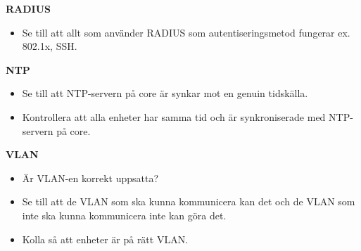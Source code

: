 \noindent \textbf{RADIUS}
\begin{itemize}[noitemsep]
    \item Se till att allt som använder RADIUS som autentiseringsmetod fungerar ex. 802.1x, SSH.
\end{itemize}

\noindent \textbf{NTP}
\begin{itemize}[noitemsep]
    \item Se till att NTP-servern på core är synkar mot en genuin tidskälla.
    \item Kontrollera att alla enheter har samma tid och är synkroniserade med NTP-servern på core.
\end{itemize}

\noindent \textbf{VLAN}
\begin{itemize}[noitemsep]
    \item Är VLAN-en korrekt uppsatta?
    \item Se till att de VLAN som ska kunna kommunicera kan det och de VLAN som inte ska kunna kommunicera inte kan göra det.
    \item Kolla så att enheter är på rätt VLAN.
\end{itemize}

